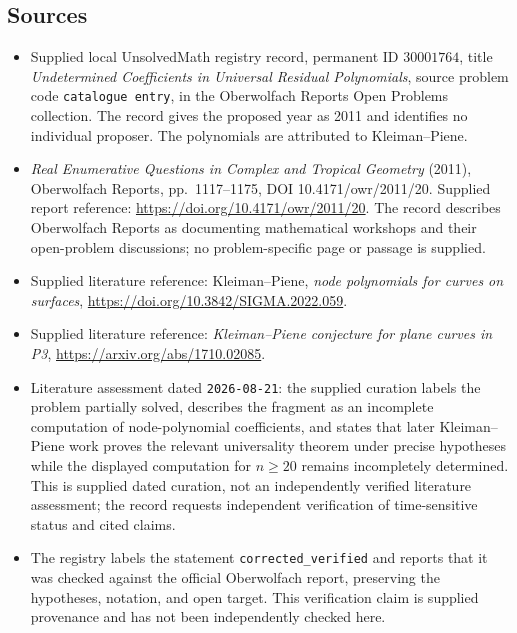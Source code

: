 \documentclass[11pt]{article}
\begin{document}
\subsection{Sources}
\begin{itemize}
\item Supplied local UnsolvedMath registry record, permanent ID \(30001764\), title \emph{Undetermined Coefficients in Universal Residual Polynomials}, source problem code \texttt{catalogue entry}, in the Oberwolfach Reports Open Problems collection. The record gives the proposed year as 2011 and identifies no individual proposer. The polynomials are attributed to Kleiman--Piene.
\item \emph{Real Enumerative Questions in Complex and Tropical Geometry} (2011), Oberwolfach Reports, pp.\ 1117--1175, DOI 10.4171/owr/2011/20. Supplied report reference: \url{https://doi.org/10.4171/owr/2011/20}. The record describes Oberwolfach Reports as documenting mathematical workshops and their open-problem discussions; no problem-specific page or passage is supplied.
\item Supplied literature reference: Kleiman--Piene, \emph{node polynomials for curves on surfaces}, \url{https://doi.org/10.3842/SIGMA.2022.059}.
\item Supplied literature reference: \emph{Kleiman--Piene conjecture for plane curves in P3}, \url{https://arxiv.org/abs/1710.02085}.
\item Literature assessment dated \texttt{2026-08-21}: the supplied curation labels the problem partially solved, describes the fragment as an incomplete computation of node-polynomial coefficients, and states that later Kleiman--Piene work proves the relevant universality theorem under precise hypotheses while the displayed computation for \(n\geq20\) remains incompletely determined. This is supplied dated curation, not an independently verified literature assessment; the record requests independent verification of time-sensitive status and cited claims.
\item The registry labels the statement \texttt{corrected\_verified} and reports that it was checked against the official Oberwolfach report, preserving the hypotheses, notation, and open target. This verification claim is supplied provenance and has not been independently checked here.
\end{itemize}
\end{document}
